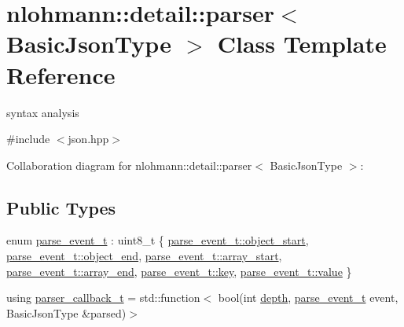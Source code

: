 \hypertarget{classnlohmann_1_1detail_1_1parser}{}\section{nlohmann\+:\+:detail\+:\+:parser$<$ Basic\+Json\+Type $>$ Class Template Reference}
\label{classnlohmann_1_1detail_1_1parser}


syntax analysis  




{\ttfamily \#include $<$json.\+hpp$>$}



Collaboration diagram for nlohmann\+:\+:detail\+:\+:parser$<$ Basic\+Json\+Type $>$\+:
\subsection*{Public Types}
\begin{DoxyCompactItemize}
\item 
enum \hyperlink{classnlohmann_1_1detail_1_1parser_a37ac88c864dda495f72cb62776b0bebe}{parse\+\_\+event\+\_\+t} \+: uint8\+\_\+t \{ \newline
\hyperlink{classnlohmann_1_1detail_1_1parser_a37ac88c864dda495f72cb62776b0bebeae73f17027cb0acbb537f29d0a6944b26}{parse\+\_\+event\+\_\+t\+::object\+\_\+start}, 
\hyperlink{classnlohmann_1_1detail_1_1parser_a37ac88c864dda495f72cb62776b0bebeaf63e2a2468a37aa4f394fcc3bcb8249c}{parse\+\_\+event\+\_\+t\+::object\+\_\+end}, 
\hyperlink{classnlohmann_1_1detail_1_1parser_a37ac88c864dda495f72cb62776b0bebeaa4388a3d92419edbb1c6efd4d52461f3}{parse\+\_\+event\+\_\+t\+::array\+\_\+start}, 
\hyperlink{classnlohmann_1_1detail_1_1parser_a37ac88c864dda495f72cb62776b0bebea49642fb732aa2e112188fba1f9d3ef7f}{parse\+\_\+event\+\_\+t\+::array\+\_\+end}, 
\newline
\hyperlink{classnlohmann_1_1detail_1_1parser_a37ac88c864dda495f72cb62776b0bebea3c6e0b8a9c15224a8228b9a98ca1531d}{parse\+\_\+event\+\_\+t\+::key}, 
\hyperlink{classnlohmann_1_1detail_1_1parser_a37ac88c864dda495f72cb62776b0bebea2063c1608d6e0baf80249c42e2be5804}{parse\+\_\+event\+\_\+t\+::value}
 \}
\item 
using \hyperlink{classnlohmann_1_1detail_1_1parser_ad250ad4f2b4af4a497e727c963162ff1}{parser\+\_\+callback\+\_\+t} = std\+::function$<$ bool(int \hyperlink{classnlohmann_1_1detail_1_1parser_a49dca6af052e9cab3a48dc1eaa163063}{depth}, \hyperlink{classnlohmann_1_1detail_1_1parser_a37ac88c864dda495f72cb62776b0bebe}{parse\+\_\+event\+\_\+t} event, Basic\+Json\+Type \&parsed)$>$
\end{DoxyCompactItemize}
